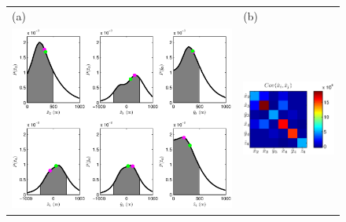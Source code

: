 \documentclass[grl]{agutex}
\begin{document}
\begin{figure}
\begin{tabular}{ll}
(a) & (b) \\
\multirow{3}{*}{\noindent\includegraphics[width=25pc]{./diags/CopiedFromThesis/Kalannie-CWI-NAB-1Dmarginals-withareas.eps}}
& \multirow{2}{*}{\includegraphics[width=10pc]{./diags/CopiedFromThesis/Kalannie_covariance.eps}}\\

\end{tabular}
\end{figure}
\end{document}

